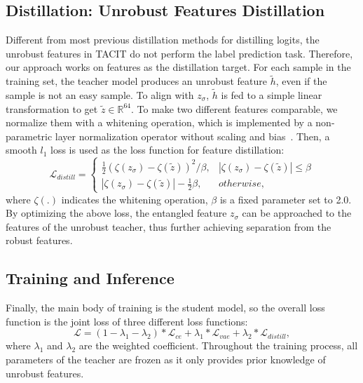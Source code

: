 \documentclass[letterpaper]{article} %
\begin{document}
\subsection{Distillation: Unrobust Features Distillation}
Different from most previous distillation methods for distilling logits, the unrobust features in TACIT do not perform the label prediction task. Therefore, our approach works on features as the distillation target. For each sample in the training set, the teacher model produces an unrobust feature $\tilde{h}$, even if the sample is not an easy sample. To align with $z_\sigma$, $\tilde{h}$ is fed to a simple linear transformation to get $\tilde{z} \in \mathbb{R}^{64}$. To make two different features comparable, we normalize them with a whitening operation, which is implemented by a non-parametric layer normalization operator without scaling and bias~\cite{Yixuan2022}. Then, a smooth $l_1$ loss is used as the loss function for feature distillation:
\begin{equation}
	\mathcal{L}_{distill} = \left\{
	\begin{array}{ll}
		\frac{1}{2}(\mathcal{\zeta}(z_\sigma)-\mathcal{\zeta}(\tilde{z}))^2/\beta, & |\mathcal{\zeta}(z_\sigma)-\mathcal{\zeta}(\tilde{z})|\leq \beta  \\
		|\mathcal{\zeta}(z_\sigma)-\mathcal{\zeta}(\tilde{z})| - \frac{1}{2}\beta, & otherwise,
	\end{array} \right.
\end{equation}
where $\zeta(.)$ indicates the whitening operation, $\beta$ is a fixed parameter set to 2.0. By optimizing the above loss, the entangled feature $z_\sigma$ can be approached to the features of the unrobust teacher, thus further achieving separation from the robust features.

\subsection{Training and Inference}
Finally, the main body of training is the student model, so the overall loss function is the joint loss of three different loss functions:
\begin{equation}
	\mathcal{L} = (1-\lambda_1-\lambda_2)*\mathcal{L}_{ce} + \lambda_1*\mathcal{L}_{vae} + \lambda_2*\mathcal{L}_{distill},
\end{equation}
where $\lambda_1$ and $\lambda_2$ are the weighted coefficient. Throughout the training process, all parameters of the teacher are frozen as it only provides prior knowledge of unrobust features.
\end{document}
